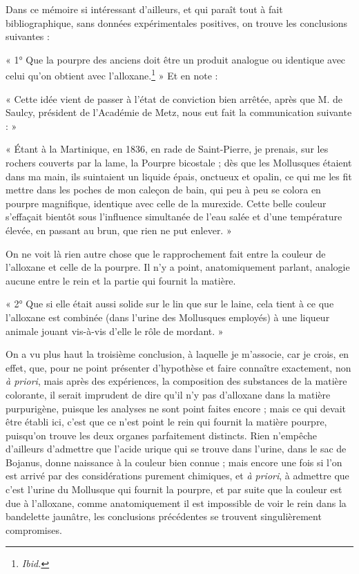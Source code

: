 \documentclass[a4paper, 11pt, oneside, polutonikogreek, french]{article}
\begin{document}
Dans ce mémoire si intéressant d'ailleurs, et qui paraît tout à fait bibliographique, sans données expérimentales positives, on trouve les conclusions suivantes :

« 1° Que la pourpre des anciens doit être un produit analogue ou identique avec celui qu'on obtient avec l'alloxane.\footnote{\emph{Ibid.}} » Et en note :

« Cette idée vient de passer à l'état de conviction bien arrêtée, après que M. de Saulcy, président de l'Académie de Metz, nous eut fait la communication suivante : »

« Étant à la Martinique, en 1836, en rade de Saint-Pierre, je prenais, sur les rochers couverts par la lame, la Pourpre bicostale ; dès que les Mollusques étaient dans ma main, ils suintaient un liquide épais, onctueux et opalin, ce qui me les fit mettre dans les poches de mon caleçon de bain, qui peu à peu se colora en pourpre magnifique, identique avec celle de la murexide. Cette belle couleur s'effaçait bientôt sous l'influence simultanée de l'eau salée et d'une température élevée, en passant au brun, que rien ne put enlever. »

On ne voit là rien autre chose que le rapprochement fait entre la couleur de l'alloxane et celle de la pourpre. Il n'y a point, anatomiquement parlant, analogie aucune entre le rein et la partie qui fournit la matière.

« 2° Que si elle était aussi solide sur le lin que sur le laine, cela tient à ce que l'alloxane est combinée (dans l'urine des Mollusques employés) à une liqueur animale jouant vis-à-vis d'elle le rôle de mordant. »

On a vu plus haut la troisième conclusion, à laquelle je m'associe, car je crois, en effet, que, pour ne point présenter d'hypothèse et faire connaître exactement, non \emph{à priori}, mais après des expériences, la composition des substances de la matière colorante, il serait imprudent de dire qu'il n'y pas d'alloxane dans la matière purpurigène, puisque les analyses ne sont point faites encore ; mais ce qui devait être établi ici, c'est que ce n'est point le rein qui fournit la matière pourpre, puisqu'on trouve les deux organes parfaitement distincts. Rien n'empêche d'ailleurs d'admettre que l'acide urique qui se trouve dans l'urine, dans le sac de Bojanus, donne naissance à la couleur bien connue ; mais encore une fois si l'on est arrivé par des considérations purement chimiques, et \emph{à priori}, à admettre que c'est l'urine du Mollusque qui fournit la pourpre, et par suite que la couleur est due à l'alloxane, comme anatomiquement il est impossible de voir le rein dans la bandelette jaunâtre, les conclusions précédentes se trouvent singulièrement compromises.
\end{document}
